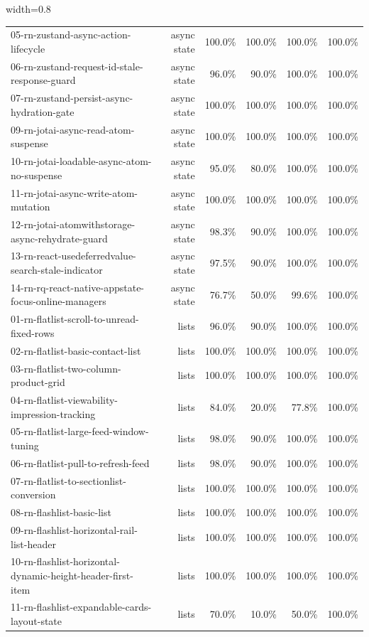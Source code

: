 \begin{table}[htbp]
\begin{adjustbox}{width=0.8\textwidth}
\begin{tabular}{lrrrrr}
05-rn-zustand-async-action-lifecycle & async state & 100.0\% & 100.0\% & 100.0\% & 100.0\% \\
06-rn-zustand-request-id-stale-response-guard & async state & 96.0\% & 90.0\% & 100.0\% & 100.0\% \\
07-rn-zustand-persist-async-hydration-gate & async state & 100.0\% & 100.0\% & 100.0\% & 100.0\% \\
09-rn-jotai-async-read-atom-suspense & async state & 100.0\% & 100.0\% & 100.0\% & 100.0\% \\
10-rn-jotai-loadable-async-atom-no-suspense & async state & 95.0\% & 80.0\% & 100.0\% & 100.0\% \\
11-rn-jotai-async-write-atom-mutation & async state & 100.0\% & 100.0\% & 100.0\% & 100.0\% \\
12-rn-jotai-atomwithstorage-async-rehydrate-guard & async state & 98.3\% & 90.0\% & 100.0\% & 100.0\% \\
13-rn-react-usedeferredvalue-search-stale-indicator & async state & 97.5\% & 90.0\% & 100.0\% & 100.0\% \\
14-rn-rq-react-native-appstate-focus-online-managers & async state & 76.7\% & 50.0\% & 99.6\% & 100.0\% \\
01-rn-flatlist-scroll-to-unread-fixed-rows & lists & 96.0\% & 90.0\% & 100.0\% & 100.0\% \\
02-rn-flatlist-basic-contact-list & lists & 100.0\% & 100.0\% & 100.0\% & 100.0\% \\
03-rn-flatlist-two-column-product-grid & lists & 100.0\% & 100.0\% & 100.0\% & 100.0\% \\
04-rn-flatlist-viewability-impression-tracking & lists & 84.0\% & 20.0\% & 77.8\% & 100.0\% \\
05-rn-flatlist-large-feed-window-tuning & lists & 98.0\% & 90.0\% & 100.0\% & 100.0\% \\
06-rn-flatlist-pull-to-refresh-feed & lists & 98.0\% & 90.0\% & 100.0\% & 100.0\% \\
07-rn-flatlist-to-sectionlist-conversion & lists & 100.0\% & 100.0\% & 100.0\% & 100.0\% \\
08-rn-flashlist-basic-list & lists & 100.0\% & 100.0\% & 100.0\% & 100.0\% \\
09-rn-flashlist-horizontal-rail-list-header & lists & 100.0\% & 100.0\% & 100.0\% & 100.0\% \\
10-rn-flashlist-horizontal-dynamic-height-header-first-item & lists & 100.0\% & 100.0\% & 100.0\% & 100.0\% \\
11-rn-flashlist-expandable-cards-layout-state & lists & 70.0\% & 10.0\% & 50.0\% & 100.0\% \\

\end{tabular}
\end{adjustbox}
\end{table}
